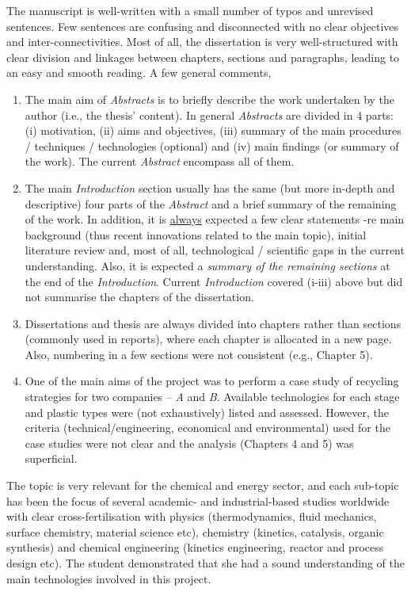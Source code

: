 \documentclass[14pt,twoside]{report}
\begin{document}
The manuscript is well-written with a small number of typos and unrevised sentences. Few sentences are confusing and disconnected with no clear objectives and inter-connectivities. Most of all, the dissertation is very well-structured with clear division and linkages between chapters, sections and paragraphs, leading to an easy and smooth reading.  A few general comments,
\begin{enumerate}
%
\item The main aim of {\it Abstracts} is to briefly describe the work undertaken by the author (i.e., the thesis' content). In general {\it Abstracts} are divided in 4 parts: (i) motivation, (ii) aims and objectives, (iii) summary of the main procedures / techniques / technologies (optional) and (iv) main findings (or summary of the work). The current {\it Abstract} encompass all of them.
%
\item The main {\it Introduction} section usually has the same (but more in-depth and descriptive) four parts of the {\it Abstract} and a brief summary of the remaining of the work. In addition, it is \underline{always} expected a few clear statements -re main background (thus recent innovations related to the main topic), initial literature review and, most of all, technological / scientific gaps in the current understanding. Also, it is expected a {\it summary of the remaining sections} at the end of the {\it Introduction}.  Current {\it Introduction} covered (i-iii) above but did not summarise the chapters of the dissertation.
%
\item Dissertations and thesis are always divided into chapters rather than sections (commonly used in reports), where each chapter is allocated in a new page. Also, numbering in a few sections were not consistent (e.g., Chapter 5).
%
\item One of the main aims of the project was to perform a case study of recycling strategies for two companies -- {\it A} and {\it B}. Available technologies for each stage and plastic types were (not exhaustively) listed and assessed. However, the criteria (technical/engineering, economical and environmental) used for the case studies were not clear and the analysis (Chapters 4 and 5) was superficial.     
% 
\end{enumerate}

The topic is very relevant for the chemical and energy sector, and each sub-topic has been the focus of several academic- and industrial-based studies worldwide with clear cross-fertilisation with physics (thermodynamics, fluid mechanics, surface chemistry, material science etc), chemistry (kinetics, catalysis, organic synthesis) and chemical engineering (kinetics engineering, reactor and process design etc). The student demonstrated that she had a sound understanding of the main technologies involved in this project.
\end{document}
